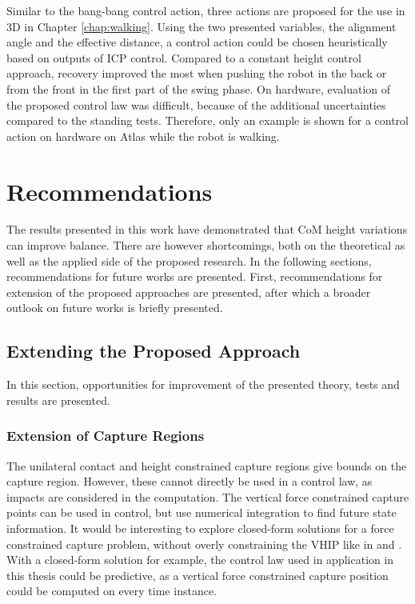 Similar to the bang-bang control action, three actions are proposed for the use in \ac{3D} in Chapter \ref{chap:walking}. Using the two presented variables, the alignment angle and the effective distance, a control action could be chosen heuristically based on outputs of \ac{ICP} control. Compared to a constant height control approach, recovery improved the most when pushing the robot in the back or from the front in the first part of the swing phase. On hardware, evaluation of the proposed control law was difficult, because of the additional uncertainties compared to the standing tests. Therefore, only an example is shown for a control action on hardware on Atlas while the robot is walking.

\section{Recommendations}
The results presented in this work have demonstrated that \ac{CoM} height variations can improve balance. There are however shortcomings, both on the theoretical as well as the applied side of the proposed research. In the following sections, recommendations for future works are presented. First, recommendations for extension of the proposed approaches are presented, after which a broader outlook on future works is briefly presented.
\subsection{Extending the Proposed Approach }
In this section, opportunities for improvement of the presented theory, tests and results are presented.
\subsubsection{Extension of Capture Regions}
The unilateral contact and height constrained capture regions give bounds on the capture region. However, these cannot directly be used in a control law, as impacts are considered in the computation. The vertical force constrained capture points can be used in control, but use numerical integration to find future state information. It would be interesting to explore closed-form solutions for a force constrained capture problem, without overly constraining the \ac{VHIP} like in \cite{pratt2007derivation} and \cite{koolen2016balance}. With a closed-form solution for example, the control law used in application in this thesis could be predictive, as a vertical force constrained capture position could be computed on every time instance.
